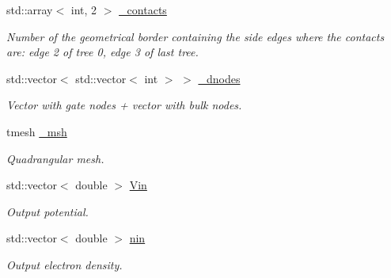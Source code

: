 \begin{DoxyCompactItemize}
\mbox{\label{class_probl_ad0987da6c7975bf9018ff9891012695d}} 
std\+::array$<$ int, 2 $>$ \mbox{\hyperlink{class_probl_ad0987da6c7975bf9018ff9891012695d}{\+\_\+contacts}}
\begin{DoxyCompactList}\small\item\em Number of the geometrical border containing the side edges where the contacts are\+: edge 2 of tree 0, edge 3 of last tree. \end{DoxyCompactList}\item 
\mbox{\label{class_probl_a8889847da2dc2951c2dfa4721eff2c37}} 
std\+::vector$<$ std\+::vector$<$ int $>$ $>$ \mbox{\hyperlink{class_probl_a8889847da2dc2951c2dfa4721eff2c37}{\+\_\+dnodes}}
\begin{DoxyCompactList}\small\item\em Vector with gate nodes + vector with bulk nodes. \end{DoxyCompactList}\item 
\mbox{\label{class_probl_af4f306af8b9db4fd6422ece4eb4d2fe7}} 
tmesh \mbox{\hyperlink{class_probl_af4f306af8b9db4fd6422ece4eb4d2fe7}{\+\_\+msh}}
\begin{DoxyCompactList}\small\item\em Quadrangular mesh. \end{DoxyCompactList}\item 
\mbox{\label{class_probl_a28977a40e8789bec175404c711bdcee3}} 
std\+::vector$<$ double $>$ \mbox{\hyperlink{class_probl_a28977a40e8789bec175404c711bdcee3}{Vin}}
\begin{DoxyCompactList}\small\item\em Output potential. \end{DoxyCompactList}\item 
\mbox{\label{class_probl_a398affcfb0a2ac6033866f5c6a2d3d27}} 
std\+::vector$<$ double $>$ \mbox{\hyperlink{class_probl_a398affcfb0a2ac6033866f5c6a2d3d27}{nin}}
\begin{DoxyCompactList}\small\item\em Output electron density. \end{DoxyCompactList}\item 
\mbox{\label{class_probl_a8366d5132536de44debdda93a930a4cc}} 

\end{DoxyCompactItemize}
